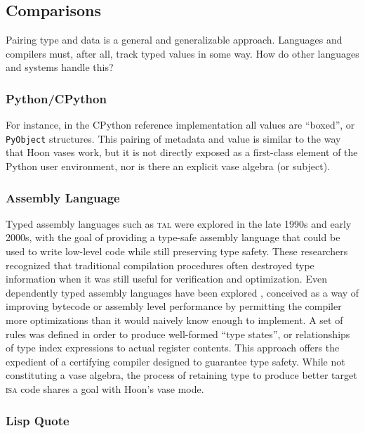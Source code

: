 \documentclass[twoside]{article}
\begin{document}
\subsection{Comparisons}

Pairing type and data is a general and generalizable approach.  Languages and compilers must, after all, track typed values in some way.  How do other languages and systems handle this?

\subsubsection{Python/CPython}

For instance, in the CPython reference implementation all values are ``boxed'', or \texttt{PyObject} structures.  This pairing of metadata and value is similar to the way that Hoon vases work, but it is not directly exposed as a first-class element of the Python user environment, nor is there an explicit vase algebra (or subject).

\subsubsection{Assembly Language}

Typed assembly languages such as \textsc{tal} \citep{Morrisett1999} were explored in the late 1990s and early 2000s, with the goal of providing a type-safe assembly language that could be used to write low-level code while still preserving type safety.  These researchers recognized that traditional compilation procedures often destroyed type information when it was still useful for verification and optimization.  Even dependently typed assembly languages have been explored \citep{Xi2001}, conceived as a way of improving bytecode or assembly level performance by permitting the compiler more optimizations than it would naively know enough to implement.  A set of rules was defined in order to produce well-formed ``type states'', or relationships of type index expressions to actual register contents.  This approach offers the expedient of a certifying compiler designed to guarantee type safety.  While not constituting a vase algebra, the process of retaining type to produce better target \textsc{isa} code shares a goal with Hoon's vase mode.

\subsubsection{Lisp Quote}
\end{document}
